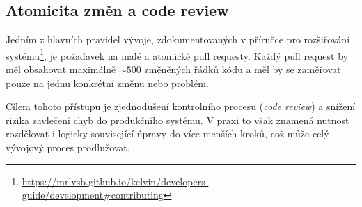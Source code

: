 \subsection{Atomicita změn a code review}
\label{subsec:kelvin-development-atomicity}

Jedním z hlavních pravidel vývoje, zdokumentovaných v příručce pro rozšiřování systému\footnote[2]{\href{https://mrlvsb.github.io/kelvin/developers-guide/development\#contributing}{https://mrlvsb.github.io/kelvin/developers-guide/development\#contributing}}, je požadavek na malé a atomické pull requesty.
Každý pull request by měl obsahovat maximálně $\sim500$ změněných řádků kódu a měl by se zaměřovat pouze na jednu konkrétní změnu nebo problém.

Cílem tohoto přístupu je zjednodušení kontrolního procesu (\textit{code review}) a snížení rizika zavlečení chyb do produkčního systému.
V praxi to však znamená nutnost rozdělovat i logicky související úpravy do více menších kroků, což může celý vývojový proces prodlužovat.

\endinput
